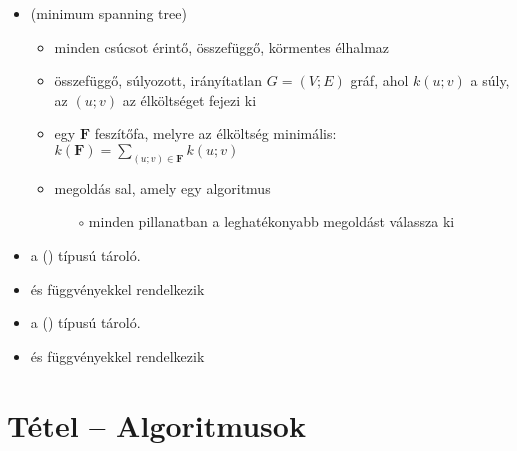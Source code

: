 \documentclass[main.tex]{subfiles}
\begin{document}
\begin{itemize}
    \item {}
    (minimum spanning tree)
    \begin{itemize}
      \item minden csúcsot érintő, összefüggő,
      körmentes élhalmaz

      \item {} összefüggő, súlyozott,
      irányítatlan $G = (V; E)$ gráf, ahol $k(u; v)$
      a súly, az $(u;v)$ az élköltséget fejezi ki

      \item {} egy $\mathbf{F}$ feszítőfa,
      melyre az élköltség minimális:
      $k(\mathbf{F}) = \displaystyle\sum_{(u;v) \in \mathbf{F}} k(u;v)$
      
      \item megoldás sal, amely egy
       algoritmus
      \begin{itemize}
        \item[$\circ$] minden pillanatban a leghatékonyabb megoldást válassza ki
      \end{itemize}
    \end{itemize}
  \end{itemize}

  \begin{itemize}
    \item a  () 
    típusú tároló.

    \item {} és  függvényekkel rendelkezik
  \end{itemize}

  \begin{itemize}
    \item a  () 
    típusú tároló.

    \item {} és  függvényekkel rendelkezik
  \end{itemize}


  \section{Tétel – Algoritmusok} %
\end{document}
